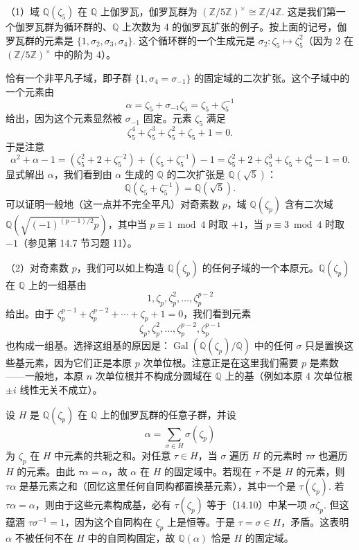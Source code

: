 \begin{example}
（1）域 \(\mathbb{Q}(\zeta_5)\) 在 \(\mathbb{Q}\) 上伽罗瓦，伽罗瓦群为 \((\mathbb{Z}/5\mathbb{Z})^\times \cong \mathbb{Z}/4\mathbb{Z}\). 这是我们第一个伽罗瓦群为循环群的、\(\mathbb{Q}\) 上次数为 4 的伽罗瓦扩张的例子。按上面的记号，伽罗瓦群的元素是 \(\{1, \sigma_2, \sigma_3, \sigma_4\}\). 这个循环群的一个生成元是 \(\sigma_2 : \zeta_5 \mapsto \zeta_5^2\)（因为 2 在 \((\mathbb{Z}/5\mathbb{Z})^\times\) 中的阶为 4）。

恰有一个非平凡子域，即子群 \(\{1, \sigma_4 = \sigma_{-1}\}\) 的固定域的二次扩张。这个子域中的一个元素由
\[
\alpha = \zeta_5+\sigma_{-1}\zeta_5 = \zeta_5+\zeta_5^{-1}
\]
给出，因为这个元素显然被 \(\sigma_{-1}\) 固定。元素 \(\zeta_5\) 满足
\[
\zeta_5^4+\zeta_5^3+\zeta_5^2+\zeta_5+1 = 0.
\]
于是注意
\[
\alpha^2+\alpha-1 = (\zeta_5^2+2+\zeta_5^{-2})+(\zeta_5+\zeta_5^{-1})-1 = \zeta_5^2+2+\zeta_5^3+\zeta_5+\zeta_5^4-1 = 0.
\]
显式解出 \(\alpha\)，我们看到由 \(\alpha\) 生成的 \(\mathbb{Q}\) 的二次扩张是 \(\mathbb{Q}(\sqrt{5})\)：
\[
\mathbb{Q}(\zeta_5+\zeta_5^{-1}) = \mathbb{Q}(\sqrt{5}).
\]
可以证明一般地（这一点并不完全平凡）对奇素数 \(p\)，域 \(\mathbb{Q}(\zeta_p)\) 含有二次域 \(\mathbb{Q}(\sqrt{(-1)^{(p-1)/2}p})\)，其中当 \(p \equiv 1 \bmod 4\) 时取 \(+1\)，当 \(p \equiv 3 \bmod 4\) 时取 \(-1\)（参见第 14.7 节习题 11）。

（2）对奇素数 \(p\)，我们可以如上构造 \(\mathbb{Q}(\zeta_p)\) 的任何子域的一个本原元。\(\mathbb{Q}(\zeta_p)\) 在 \(\mathbb{Q}\) 上的一组基由
\[
1, \zeta_p, \zeta_p^2, \ldots, \zeta_p^{p-2}
\]
给出。由于 \(\zeta_p^{p-1}+\zeta_p^{p-2}+\cdots+\zeta_p+1 = 0\)，我们看到元素
\[
\zeta_p, \zeta_p^2, \ldots, \zeta_p^{p-2}, \zeta_p^{p-1}
\]
也构成一组基。选择这组基的原因是：\(\operatorname{Gal}(\mathbb{Q}(\zeta_p)/\mathbb{Q})\) 中的任何 \(\sigma\) 只是置换这些基元素，因为它们正是本原 \(p\) 次单位根。注意正是在这里我们需要 \(p\) 是素数——一般地，本原 \(n\) 次单位根并不构成分圆域在 \(\mathbb{Q}\) 上的基（例如本原 4 次单位根 \(\pm i\) 线性无关不成立）。

设 \(H\) 是 \(\mathbb{Q}(\zeta_p)\) 在 \(\mathbb{Q}\) 上的伽罗瓦群的任意子群，并设
\begin{equation}
\alpha = \sum_{\sigma \in H}\sigma(\zeta_p) \tag{14.10}
\end{equation}
为 \(\zeta_p\) 在 \(H\) 中元素的共轭之和。对任意 \(\tau \in H\)，当 \(\sigma\) 遍历 \(H\) 的元素时 \(\tau\sigma\) 也遍历 \(H\) 的元素。由此 \(\tau\alpha = \alpha\)，故 \(\alpha\) 在 \(H\) 的固定域中。若现在 \(\tau\) 不是 \(H\) 的元素，则 \(\tau\alpha\) 是基元素之和（回忆这里任何自同构都置换基元素），其中一个是 \(\tau(\zeta_p)\). 若 \(\tau\alpha = \alpha\)，则由于这些元素构成基，必有 \(\tau(\zeta_p)\) 等于（14.10）中某一项 \(\sigma\zeta_p\). 但这蕴涵 \(\tau\sigma^{-1} = 1\)，因为这个自同构在 \(\zeta_p\) 上是恒等。于是 \(\tau = \sigma \in H\)，矛盾。这表明 \(\alpha\) 不被任何不在 \(H\) 中的自同构固定，故 \(\mathbb{Q}(\alpha)\) 恰是 \(H\) 的固定域。


\end{example}
